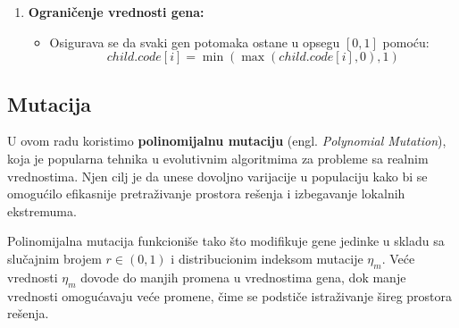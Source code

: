 \documentclass[12pt]{article}
\begin{document}
\begin{enumerate}
    \item \textbf{Ograničenje vrednosti gena:}
    \begin{itemize}
        \item Osigurava se da svaki gen potomaka ostane u opsegu $[0,1]$ pomoću:
        \[
        child.code[i] = \min(\max(child.code[i], 0), 1)
        \]
    \end{itemize}
\end{enumerate}


\subsection{Mutacija}
U ovom radu koristimo \textbf{polinomijalnu mutaciju} (engl. \textit{Polynomial Mutation}), koja je popularna tehnika u evolutivnim algoritmima za probleme sa realnim vrednostima. Njen cilj je da unese dovoljno varijacije u populaciju kako bi se omogućilo efikasnije pretraživanje prostora rešenja i izbegavanje lokalnih ekstremuma.

Polinomijalna mutacija funkcioniše tako što modifikuje gene jedinke u skladu sa slučajnim brojem $r \in (0,1)$ i distribucionim indeksom mutacije $\eta_m$. Veće vrednosti $\eta_m$ dovode do manjih promena u vrednostima gena, dok manje vrednosti omogućavaju veće promene, čime se podstiče istraživanje šireg prostora rešenja. 
\end{document}
